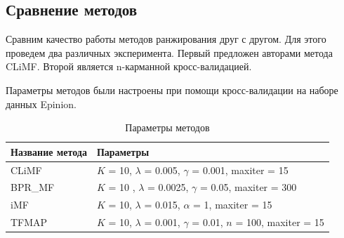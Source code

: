 \documentclass[14pt]{extarticle}
\begin{document}
\begin{table}[H]
\caption{\label{tab:canonsummary}Статистические характеристики}
\end{table} 

\subsection{Сравнение методов}
 Сравним качество работы методов ранжирования друг с другом. Для этого проведем два различных  эксперимента. Первый предложен авторами метода CLiMF. Второй является n-карманной кросс-валидацией.
 
Параметры методов были настроены при помощи кросс-валидации на наборе данных Epinion. 

\begin{table}[H]
\caption{Параметры методов}
\begin{tabular}{|l|l|}
\hline
Название метода & Параметры\\
\hline 
  CLiMF & $K$ = 10,  $\lambda$ = 0.005, $\gamma$ = 0.001, maxiter = 15\\
\hline
  BPR\_MF & $K$ = 10 ,  $\lambda$ = 0.0025, $\gamma$ = 0.05, maxiter = 300\\
\hline 
  iMF & $K$ = 10,  $\lambda$ = 0.015, $\alpha$ = 1, maxiter = 15\\
\hline 
TFMAP & $K$ = 10, $\lambda$ = 0.001, $\gamma$ = 0.01, $n$ = 100,  maxiter = 15\\
\hline
\end{tabular}
\end{table} 
 
\end{document}
